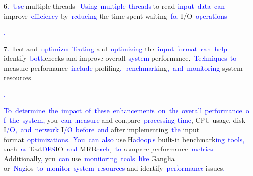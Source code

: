 \documentclass{article}
\begin{document}
\begin{tcolorbox}[colframe=black,colback=white]
{}6\textcolor{blue}{.}\textcolor{blue}{~Use} multiple threads\textcolor{blue}{:}\textcolor{blue}{~Using}\textcolor{blue}{~multiple}\textcolor{blue}{~threads} to read\textcolor{blue}{~input}\textcolor{blue}{~data}\textcolor{blue}{~can} improve\textcolor{blue}{~efficiency} by\textcolor{blue}{~reducing} the time spent waiting\textcolor{blue}{~for} I/O\textcolor{blue}{~operations}\textcolor{blue}{.

}7\textcolor{blue}{.} Test and\textcolor{blue}{~optimize}\textcolor{blue}{:}\textcolor{blue}{~Testing} and\textcolor{blue}{~optimizing} the\textcolor{blue}{~input}\textcolor{blue}{~format}\textcolor{blue}{~can}\textcolor{blue}{~help} identify\textcolor{blue}{~bott}lenecks and improve overall\textcolor{blue}{~system} performance.\textcolor{blue}{~Techniques}\textcolor{blue}{~to} measure performance\textcolor{blue}{~include} profiling\textcolor{blue}{,}\textcolor{blue}{~benchmark}ing\textcolor{blue}{,}\textcolor{blue}{~and}\textcolor{blue}{~monitoring} system resources\textcolor{blue}{.

}\textcolor{blue}{To}\textcolor{blue}{~determine}\textcolor{blue}{~the}\textcolor{blue}{~impact}\textcolor{blue}{~of}\textcolor{blue}{~these}\textcolor{blue}{~enhancements}\textcolor{blue}{~on}\textcolor{blue}{~the}\textcolor{blue}{~overall}\textcolor{blue}{~performance}\textcolor{blue}{~of}\textcolor{blue}{~the}\textcolor{blue}{~system}\textcolor{blue}{,} you\textcolor{blue}{~can}\textcolor{blue}{~measure} and compare\textcolor{blue}{~processing}\textcolor{blue}{~time}, CPU usage, disk I\textcolor{blue}{/O}\textcolor{blue}{,}\textcolor{blue}{~and}\textcolor{blue}{~network} I\textcolor{blue}{/O}\textcolor{blue}{~before}\textcolor{blue}{~and} after implementing\textcolor{blue}{~the} input format\textcolor{blue}{~optimizations}\textcolor{blue}{.}\textcolor{blue}{~You}\textcolor{blue}{~can}\textcolor{blue}{~also} use H\textcolor{blue}{adoop}\textcolor{blue}{'s} built-in benchmark\textcolor{blue}{ing}\textcolor{blue}{~tools}\textcolor{blue}{,} such\textcolor{blue}{~as} Test\textcolor{blue}{DFS}IO\textcolor{blue}{~and} MRB\textcolor{blue}{ench},\textcolor{blue}{~to} compare performance\textcolor{blue}{~metrics}\textcolor{blue}{.} Additionally\textcolor{blue}{,} you\textcolor{blue}{~can} use\textcolor{blue}{~monitoring}\textcolor{blue}{~tools}\textcolor{blue}{~like} Ganglia or\textcolor{blue}{~Nag}ios\textcolor{blue}{~to}\textcolor{blue}{~monitor}\textcolor{blue}{~system}\textcolor{blue}{~resources} and identify\textcolor{blue}{~performance} issues\textcolor{blue}{.}\textcolor{blue}{}
\end{tcolorbox}
\end{document}
